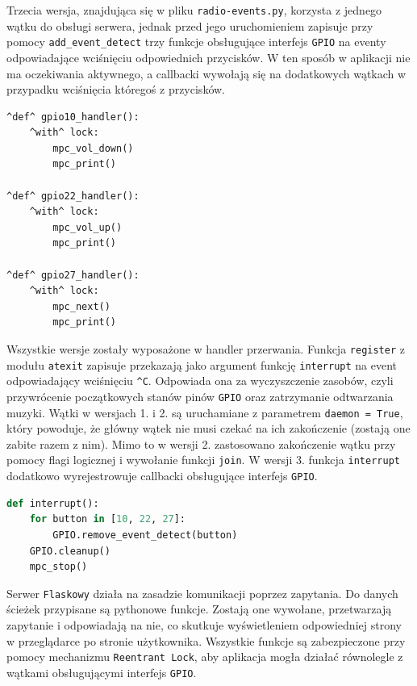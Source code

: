 \documentclass[10pt,a4paper]{article}
\begin{document}
\newpage
\noindent
Trzecia wersja, znajdująca się w pliku \texttt{radio-events.py}, korzysta z jednego wątku do obsługi serwera, jednak przed jego uruchomieniem zapisuje przy pomocy \texttt{add\_event\_detect} trzy funkcje obsługujące interfejs \texttt{GPIO} na eventy odpowiadające wciśnięciu odpowiednich przycisków. W ten sposób w aplikacji nie ma oczekiwania aktywnego, a callbacki wywołają się na dodatkowych wątkach w przypadku wciśnięcia któregoś z przycisków.
\begin{lstlisting}[style=bash, caption={Funkcje (callbacki) obsługujące interfejs GPIO (z radio-events.py)}]
^def^ gpio10_handler():
    ^with^ lock:
        mpc_vol_down()
        mpc_print()

^def^ gpio22_handler():
    ^with^ lock:
        mpc_vol_up()
        mpc_print()

^def^ gpio27_handler():
    ^with^ lock:
        mpc_next()
        mpc_print()
\end{lstlisting}
Wszystkie wersje zostały wyposażone w handler przerwania. Funkcja \texttt{register} z modułu \texttt{atexit} zapisuje przekazają jako argument funkcję \texttt{interrupt} na event odpowiadający wciśnięciu \texttt{\^}\texttt{C}. Odpowiada ona za wyczyszczenie zasobów, czyli przywrócenie początkowych stanów pinów \texttt{GPIO} oraz zatrzymanie odtwarzania muzyki. Wątki w wersjach 1. i 2. są uruchamiane z parametrem \texttt{daemon = True}, który powoduje, że główny wątek nie musi czekać na ich zakończenie (zostają one zabite razem z nim). Mimo to w wersji 2. zastosowano zakończenie wątku przy pomocy flagi logicznej i wywołanie funkcji \texttt{join}. W wersji 3. funkcja \texttt{interrupt} dodatkowo wyrejestrowuje callbacki obsługujące interfejs \texttt{GPIO}.
\begin{lstlisting}[style=bash, language=python, caption={Przykładowy handler przerwania (z radio-events.py)}]
def interrupt():
    for button in [10, 22, 27]:
        GPIO.remove_event_detect(button)
    GPIO.cleanup()
    mpc_stop()
\end{lstlisting}
Serwer \texttt{Flaskowy} działa na zasadzie komunikacji poprzez zapytania. Do danych ścieżek przypisane są pythonowe funkcje. Zostają one wywołane, przetwarzają zapytanie i odpowiadają na nie, co skutkuje wyświetleniem odpowiedniej strony w przeglądarce po stronie użytkownika. Wszystkie funkcje są zabezpieczone przy pomocy mechanizmu \texttt{Reentrant Lock}, aby aplikacja mogła działać równolegle z wątkami obsługującymi interfejs \texttt{GPIO}.
\end{document}
